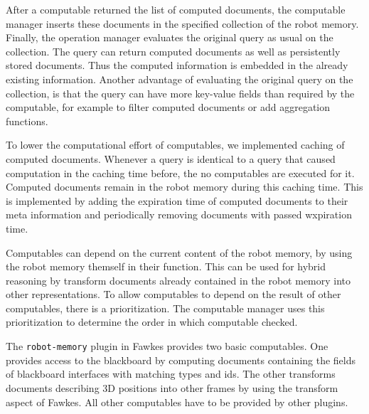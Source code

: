 After a computable returned the list of computed documents, the
computable manager inserts these documents in the specified collection
of the robot memory. Finally, the operation manager evaluates the
original query as usual on the collection. The query can return computed
documents as well as persistently stored documents. Thus the computed
information is embedded in the already existing information. Another
advantage of evaluating the original query on the collection, is that
the query can have more key-value fields than required by the
computable, for example to filter computed documents or add
aggregation functions.

To lower the computational effort of computables, we implemented
caching of computed documents. Whenever a query is identical to a
query that caused computation in the caching time before, the no
computables are executed for it. Computed documents remain in the
robot memory during this caching time. This is implemented by adding
the expiration time of computed documents to their meta information
and periodically removing documents with passed wxpiration time.

Computables can depend on the current content of the robot memory, by
using the robot memory themself in their function. This can be used
for hybrid reasoning by transform documents already contained in the
robot memory into other representations. To allow computables to
depend on the result of other computables, there is a
prioritization. The computable manager uses this prioritization to
determine the order in which computable checked.

The \texttt{robot-memory} plugin in Fawkes provides two basic
computables. One provides access to the blackboard by computing
documents containing the fields of blackboard interfaces with matching
types and ids. The other transforms documents describing 3D positions
into other frames by using the transform aspect of Fawkes. All other
computables have to be provided by other plugins.

